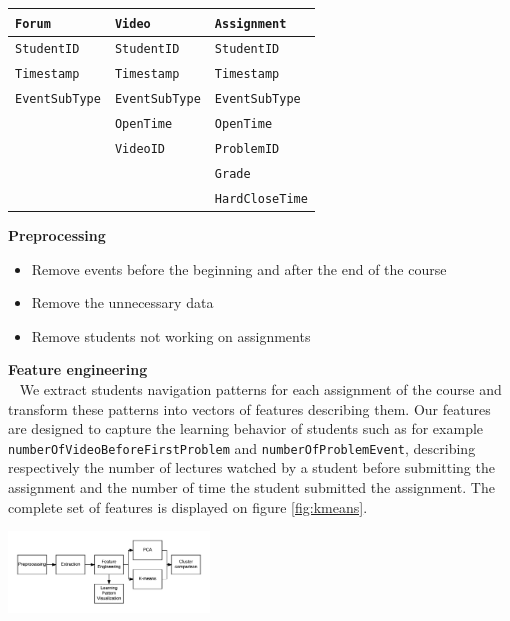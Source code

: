 \documentclass[a0,portrait]{a0poster}
\begin{document}
\begin{minipage}[c]{\linewidth}
\begin{framed}
\begin{multicols}{2}
\vspace{0.5cm}
\begin{center}
\begin{tabular}{|l|l|l|}
  \hline
  \verb|Forum| & \verb|Video| & \verb|Assignment| \\
  \hline
  \verb|StudentID| & \verb|StudentID| & \verb|StudentID| \\ 
  \verb|Timestamp| & \verb|Timestamp| & \verb|Timestamp| \\
  \verb|EventSubType| & \verb|EventSubType| & \verb|EventSubType| \\
  & \verb|OpenTime| & \verb|OpenTime| \\
  & \verb|VideoID| & \verb|ProblemID| \\
  & & \verb|Grade| \\
  & & \verb|HardCloseTime| \\
  \hline
\end{tabular}
\label{tab:logs}
\end{center}
\vspace{0.5cm}

\textbf{Preprocessing}
\begin{itemize}
\item Remove events before the beginning and after the end of the course
\item Remove the unnecessary data
\item Remove students not working on assignments
\end{itemize}

\textbf{Feature engineering} \\ 
We extract students navigation patterns for each assignment of the course and transform these patterns into vectors of features describing them. Our features are designed to capture the learning behavior of students such as for example \verb|numberOfVideoBeforeFirstProblem| and \verb|numberOfProblemEvent|, describing respectively the number of lectures watched by a student before submitting the assignment and the number of time the student submitted the assignment. The complete set of features is displayed on figure \ref{fig:kmeans}.

\begin{center}
\includegraphics[width=0.4\textwidth]{figures/process}
\end{center}
\label{fig:pipe}


\end{multicols}
\end{framed}
\end{minipage}
\end{document}
